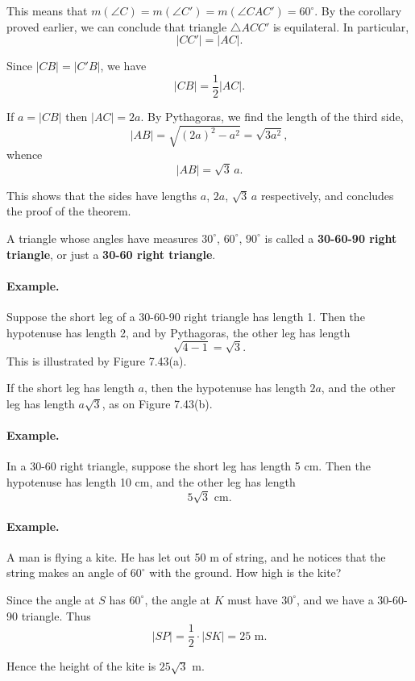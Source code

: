 \documentclass[12pt]{book} %
\begin{document}
This means that $m(\angle C)=m(\angle C')=m(\angle CAC')=60^\circ$. By the corollary proved earlier, we can conclude that triangle $\triangle ACC'$ is equilateral.
In particular,
\[
|CC'|=|AC|.
\]

Since $|CB|=|C'B|$, we have
\[
|CB|=\frac12|AC|.
\]

If $a=|CB|$ then $|AC|=2a$. By Pythagoras, we find the length of the third side,
\[
|AB|=\sqrt{(2a)^2-a^2}=\sqrt{3a^2},
\]
whence
\[
|AB|=\sqrt{3}\,a.
\]

This shows that the sides have lengths $a$, $2a$, $\sqrt{3}\,a$ respectively, and concludes the proof of the theorem.

A triangle whose angles have measures $30^\circ$, $60^\circ$, $90^\circ$ is called a \textbf{30-60-90 right triangle}, or just a \textbf{30-60 right triangle}.

\paragraph{Example.}
Suppose the short leg of a 30-60-90 right triangle has length 1. Then the hypotenuse has length 2, and by Pythagoras, the other leg has length
\[
\sqrt{4-1}=\sqrt{3}.
\]
This is illustrated by Figure 7.43(a).

If the short leg has length $a$, then the hypotenuse has length $2a$, and the other leg has length $a\sqrt{3}$, as on Figure 7.43(b).


\paragraph{Example.}
In a 30-60 right triangle, suppose the short leg has length 5 cm. Then the hypotenuse has length 10 cm, and the other leg has length
\[
5\sqrt{3}\text{ cm.}
\]

\paragraph{Example.}
A man is flying a kite. He has let out 50 m of string, and he notices that the string makes an angle of $60^\circ$ with the ground. How high is the kite?


Since the angle at $S$ has $60^\circ$, the angle at $K$ must have $30^\circ$, and we have a 30-60-90 triangle. Thus
\[
|SP|=\frac12\cdot |SK|=25\text{ m.}
\]

Hence the height of the kite is $25\sqrt{3}$ m.
\end{document}
